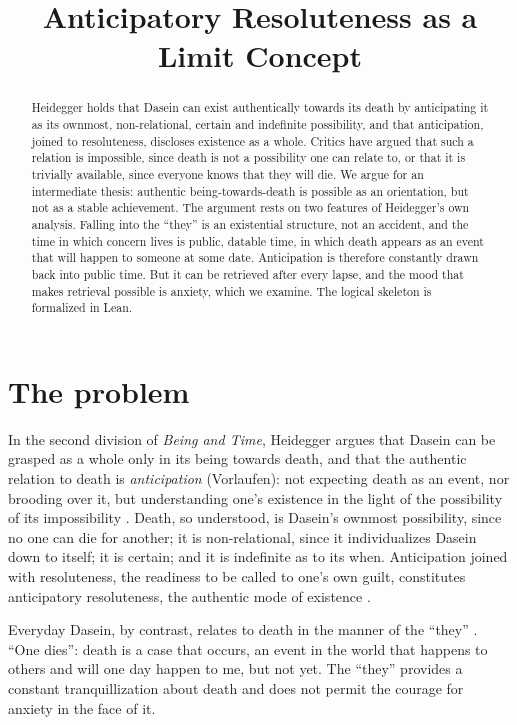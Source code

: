 \documentclass{situationist-preprint}
\title{Anticipatory Resoluteness as a Limit Concept}
\begin{document}
\maketitle

\begin{abstract}
Heidegger holds that Dasein can exist authentically towards its death by anticipating it as its ownmost, non-relational, certain and indefinite possibility, and that anticipation, joined to resoluteness, discloses existence as a whole. Critics have argued that such a relation is impossible, since death is not a possibility one can relate to, or that it is trivially available, since everyone knows that they will die. We argue for an intermediate thesis: authentic being-towards-death is possible as an orientation, but not as a stable achievement. The argument rests on two features of Heidegger's own analysis. Falling into the \enquote{they} is an existential structure, not an accident, and the time in which concern lives is public, datable time, in which death appears as an event that will happen to someone at some date. Anticipation is therefore constantly drawn back into public time. But it can be retrieved after every lapse, and the mood that makes retrieval possible is anxiety, which we examine. The logical skeleton is formalized in Lean.
\end{abstract}

\section{The problem}

In the second division of \emph{Being and Time}, Heidegger argues that Dasein can be grasped as a whole only in its being towards death, and that the authentic relation to death is \emph{anticipation} (Vorlaufen): not expecting death as an event, nor brooding over it, but understanding one's existence in the light of the possibility of its impossibility \citep[\S\S 46--53]{Heidegger1927}. Death, so understood, is Dasein's ownmost possibility, since no one can die for another; it is non-relational, since it individualizes Dasein down to itself; it is certain; and it is indefinite as to its when. Anticipation joined with resoluteness, the readiness to be called to one's own guilt, constitutes anticipatory resoluteness, the authentic mode of existence \citep[\S\S 61--62]{Heidegger1927}.

Everyday Dasein, by contrast, relates to death in the manner of the \enquote{they} \citep[\S 51]{Heidegger1927}. \enquote{One dies}: death is a case that occurs, an event in the world that happens to others and will one day happen to me, but not yet. The \enquote{they} provides a constant tranquillization about death and does not permit the courage for anxiety in the face of it.
\end{document}
